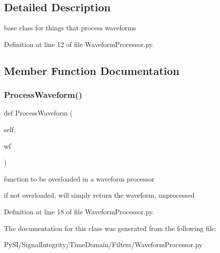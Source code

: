 \subsection{Detailed Description}
base class for things that process waveforms 

Definition at line 12 of file Waveform\+Processor.\+py.



\subsection{Member Function Documentation}
\mbox{\label{classSignalIntegrity_1_1TimeDomain_1_1Filters_1_1WaveformProcessor_1_1WaveformProcessor_ae09bec195c9cb1d5819e73b7be169b11}} 
\subsubsection{\texorpdfstring{Process\+Waveform()}{ProcessWaveform()}}
{\footnotesize\ttfamily def Process\+Waveform (\begin{DoxyParamCaption}\item[{}]{self,  }\item[{}]{wf }\end{DoxyParamCaption})}



function to be overloaded in a waveform processor 

if not overloaded, will simply return the waveform, unprocessed 

Definition at line 18 of file Waveform\+Processor.\+py.



The documentation for this class was generated from the following file\+:\begin{DoxyCompactItemize}
\item 
Py\+S\+I/\+Signal\+Integrity/\+Time\+Domain/\+Filters/Waveform\+Processor.\+py\end{DoxyCompactItemize}
